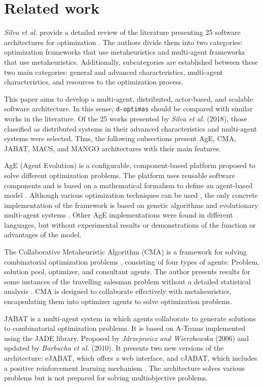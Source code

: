 \documentclass[preprint,12pt]{elsarticle}
\begin{document}
\section{Related work}
\label{sec:relatedWork}

\textit{Silva et al.} provide a detailed review of the literature presenting 25 software architectures for optimization \cite{silva2018}. The authors divide them into two categories: optimization frameworks that use metaheuristics and multi-agent frameworks that use metaheuristics. Additionally, subcategories are established between these two main categories: general and advanced characteristics, multi-agent characteristics, and resources to the optimization process.

This paper aims to develop a multi-agent, distributed, actor-based, and scalable software architecture. In this sense, \texttt{d-optimas} should be compared with similar works in the literature. Of the 25 works presented by\textit{ Silva et al.} (2018), those classified as distributed systems in their advanced characteristics and multi-agent systems were selected. Thus, the following subsections present AgE, CMA, JABAT, MACS, and MANGO architectures with their main features. 

AgE (Agent Evolution) is a configurable, component-based platform proposed to solve different optimization problems. The platform uses reusable software components and is based on a mathematical formalism to define an agent-based model \cite{piketak2009functional}. Although various optimization techniques can be used \cite{piketak2013agent}, the only concrete implementation of the framework is based on genetic algorithms and evolutionary multi-agent systems \cite{kisiel2004agent}. Other AgE implementations were found in different languages, but without experimental results or demonstrations of the function or advantages of the model.

The Collaborative Metaheuristic Algorithm (CMA) is a framework for solving combinatorial optimization problems \cite{malek2009}, consisting of four types of agents: Problem, solution pool, optimizer, and consultant agents. The author presents results for some instances of the travelling salesman problem without a detailed statistical analysis \cite{malek2010}. CMA is designed to collaborate effectively with metaheuristics, encapsulating them into optimizer agents to solve optimization problems.

JABAT is a multi-agent system in which agents collaborate to generate solutions to combinatorial optimization problems. It is based on A-Teams implemented using the JADE library. Proposed by \textit{Jdrzejowicz and Wierzbowska} (2006) and updated by \textit{Barbucha et al.} (2010). It presents two new versions of the architecture: eJABAT, which offers a web interface, and cJABAT, which includes a positive reinforcement learning mechanism \cite{jedrzejowicz2006, barbucha2010}. The architecture solves various problems but is not prepared for solving multiobjective problems.
\end{document}
